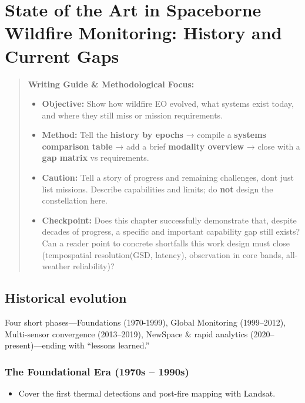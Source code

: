 \chapter{State of the Art in Spaceborne Wildfire
Monitoring: History and Current
Gaps}\label{chapter-4-state-of-the-art-in-spaceborne-wildfire-monitoring--history-and-current-gaps}

\begin{quote}
\textbf{Writing Guide \& Methodological Focus:}

\begin{itemize}
\item
  \textbf{Objective:} Show how wildfire EO evolved, what systems exist
  today, and where they still miss or mission requirements.
\item
  \textbf{Method:} Tell the \textbf{history by epochs} → compile a
  \textbf{systems comparison table} → add a brief \textbf{modality
  overview} → close with a \textbf{gap matrix} vs requirements.
\item
  \textbf{Caution:} Tell a story of progress and remaining challenges,
  don\textquotesingle t just list missions. Describe capabilities and
  limits; do \textbf{not} design the constellation here.
\item
  \textbf{Checkpoint:} Does this chapter successfully demonstrate that,
  despite decades of progress, a specific and important capability gap
  still exists? Can a reader point to concrete shortfalls this work
  design must close (tempospatial resolution(GSD, latency), observation
  in core bands, all-weather reliability)?
\end{itemize}
\end{quote}

\section{Historical evolution}\label{41-historical-evolution}

Four short phases---Foundations (1970-1999), Global Monitoring
(1999--2012), Multi-sensor convergence (2013--2019), NewSpace \& rapid
analytics (2020--present)---ending with ``lessons learned.''

\subsection{The Foundational Era (1970s --
1990s)}\label{411-the-foundational-era-1970s----1990s}

\begin{itemize}
\item
  Cover the first thermal detections and post-fire mapping with Landsat.
\end{itemize}

